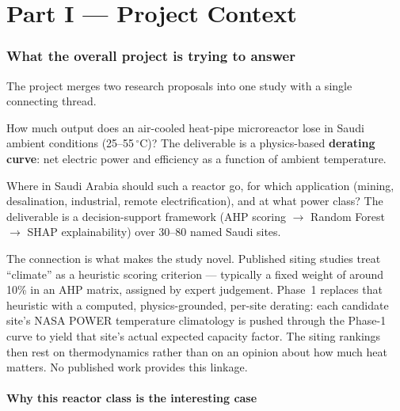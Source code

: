 \documentclass[11pt]{article}
\newcommand{\co}{$^\circ$C}
\begin{document}
\vspace{4pt}
{\small\tableofcontents}
\clearpage


\part*{Part I --- Project Context}

\section{What the overall project is trying to answer}

The project merges two research proposals into one study with a single connecting thread.

\begin{description}[leftmargin=1.6em,itemsep=3pt]
\item[Phase 1 --- \emph{the desert thermal penalty}.] How much output does an air-cooled heat-pipe
microreactor lose in Saudi ambient conditions (25--55\,\co)? The deliverable is a physics-based
\textbf{derating curve}: net electric power and efficiency as a function of ambient temperature.
\item[Phase 2 --- \emph{siting feasibility}.] Where in Saudi Arabia should such a reactor go, for which
application (mining, desalination, industrial, remote electrification), and at what power class? The
deliverable is a decision-support framework (AHP scoring $\rightarrow$ Random Forest $\rightarrow$ SHAP
explainability) over 30--80 named Saudi sites.
\end{description}

The connection is what makes the study novel. Published siting studies treat ``climate'' as a heuristic
scoring criterion --- typically a fixed weight of around 10\% in an AHP matrix, assigned by expert judgement.
Phase~1 replaces that heuristic with a computed, physics-grounded, per-site derating: each candidate site's
NASA POWER temperature climatology is pushed through the Phase-1 curve to yield that site's actual expected
capacity factor. The siting rankings then rest on thermodynamics rather than on an opinion about how much
heat matters. No published work provides this linkage.

\subsection{Why this reactor class is the interesting case}
\end{document}
